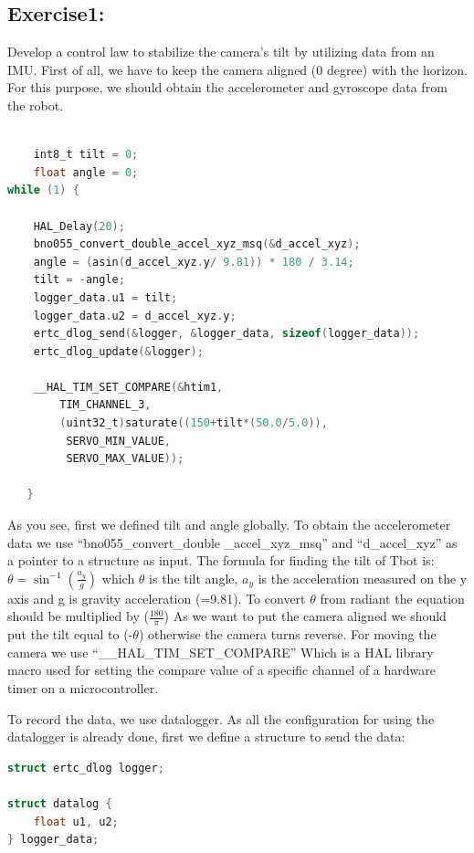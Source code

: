 \documentclass[english]{article}
\begin{document}
\subsection{Exercise1:}
Develop a control law to stabilize the camera’s tilt by utilizing data from an IMU. \newline
First of all, we have to keep the camera aligned (0 degree) with the horizon. For
this purpose, we should obtain the accelerometer and gyroscope data from the robot.
\begin{lstlisting}[language=C, caption={C code using listings}, label={lst:label} ]

    int8_t tilt = 0; 
    float angle = 0; 
while (1) { 

    HAL_Delay(20); 
    bno055_convert_double_accel_xyz_msq(&d_accel_xyz); 
    angle = (asin(d_accel_xyz.y/ 9.81)) * 180 / 3.14; 
    tilt = -angle; 
    logger_data.u1 = tilt; 
    logger_data.u2 = d_accel_xyz.y; 
    ertc_dlog_send(&logger, &logger_data, sizeof(logger_data)); 
    ertc_dlog_update(&logger); 

    __HAL_TIM_SET_COMPARE(&htim1,
        TIM_CHANNEL_3,
        (uint32_t)saturate((150+tilt*(50.0/5.0)),
         SERVO_MIN_VALUE, 
         SERVO_MAX_VALUE));  

   } 
\end{lstlisting}
As you see, first we defined tilt and angle globally. 
To obtain the accelerometer data we use “bno055\_convert\_double
\_accel\_xyz\_msq”
and “d\_accel\_xyz” as a pointer to a structure as input.
\newpage
The formula for finding the tilt of Tbot is: 
\textbf{$\theta = \sin^{-1}\left(\frac{a_y}{g}\right)$} which $\theta$ is the tilt angle,
${a_y}$ is the acceleration measured on the y axis and g is gravity acceleration (=9.81).
To convert $\theta$ from radiant the equation should be multiplied by ($\frac{180}{\pi}$)
As we want to put the camera aligned we should put the tilt equal to (-$\theta$) 
otherwise the camera turns reverse. \newline
For moving the camera we use “\_\_HAL\_TIM\_SET\_COMPARE” Which is a HAL library macro
 used for setting the compare value of a specific channel of a hardware timer on a
  microcontroller. \newline

  To record the data, we use datalogger. As all the configuration for using the 
  datalogger is already done, first we define a structure to send the data:
\begin{lstlisting}[language=C, caption={}, label={lst:datalog} ]
struct ertc_dlog logger; 

struct datalog { 
    float u1, u2; 
} logger_data;  
\end{lstlisting} 
\end{document}
